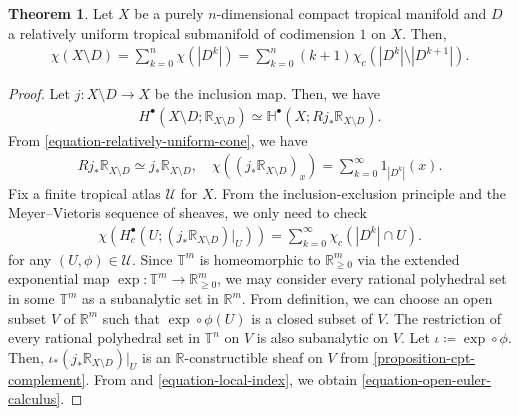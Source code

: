 \documentclass[a4paper,dvipdfmx,reqno,12pt]{amsart}
\theoremstyle{definition}
\newtheorem{theorem}{Theorem}[section]
\newcommand{\deq}{\coloneqq}
\newcommand{\opn}[1]{\operatorname{#1}}
\numberwithin{equation}{section}
\begin{document}
\begin{theorem}
\label{theorem-euler-power}
Let $X$ be a purely $n$-dimensional compact tropical manifold
and $D$ a relatively uniform tropical submanifold of
codimension $1$ on $X$. Then,
\begin{align}
\label{equation-euler-power}
\chi(X\setminus D)=\sum_{k=0}^{n}
\chi(|D^{k}|)=\sum_{k=0}^{n}(k+1)\chi_c(|D^{k}|\setminus
|D^{k+1}|).
\end{align}
\end{theorem}
\begin{proof}
Let $j\colon X\setminus D\to X$ be the inclusion map.
Then, we have 
\begin{align}
H^{\bullet}(X\setminus D;\mathbb{R}_{X\setminus D})
\simeq \mathbb{H}^{\bullet}(X;Rj_*\mathbb{R}_{X\setminus D}).
\end{align}
From \cref{equation-relatively-uniform-cone}, we have
\begin{align}
\label{equation-local-index}
Rj_*\mathbb{R}_{X\setminus D}\simeq j_*\mathbb{R}_{X\setminus D},
\quad \chi((j_*\mathbb{R}_{X\setminus D})_x)=
\sum_{k=0}^{\infty}1_{|D^{k}|}(x).
\end{align}
Fix a finite tropical atlas $\mathcal{U}$ for $X$.
From the inclusion-exclusion principle and the Meyer--Vietoris
sequence of sheaves, we only need to check
\begin{align}
\label{equation-open-euler-calculus}
\chi(H^{\bullet}_c(U;(j_*\mathbb{R}_{X\setminus D})|_{U}))
=\sum_{k=0}^{\infty}\chi_c(|D^{k}|\cap U).
\end{align}
for any $(U,\phi)\in \mathcal{U}$.
Since $\mathbb{T}^{m}$ is homeomorphic to 
$\mathbb{R}_{\geq 0}^{m}$ via the extended exponential map
$\opn{exp}\colon \mathbb{T}^{m} \to \mathbb{R}_{\geq 0}^{m}$,
we may consider every rational
polyhedral set in some $\mathbb{T}^{m}$ as a
subanalytic set in $\mathbb{R}^{m}$.
From definition, we can choose an open subset $V$ of 
$\mathbb{R}^{m}$ such that $\opn{exp}\circ\phi(U)$ is
a closed subset of $V$.
The restriction of every rational polyhedral set in $\mathbb{T}^{n}$
on $V$ is also subanalytic \cite[Proposition 8.2.2.(iii)]{MR1299726}
on $V$. Let $\iota\deq \opn{exp}\circ \phi$.
Then, $\iota_*(j_*\mathbb{R}_{X\setminus D})|_{U}$
is an $\mathbb{R}$-constructible sheaf on $V$
\cite[Definition 8.4.3]{MR1299726} from \cref{proposition-cpt-complement}.
From \cite[Theorem 9.7.1]{MR1299726} and 
\eqref{equation-local-index}, we obtain
\eqref{equation-open-euler-calculus}.
\end{proof}
\end{document}
